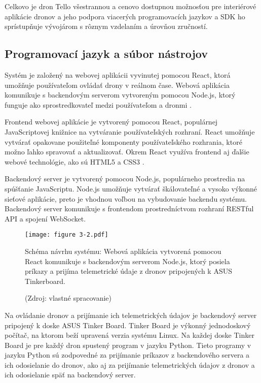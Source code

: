 Celkovo je dron Tello všestrannou a cenovo dostupnou možnosťou pre interiérové aplikácie dronov a jeho podpora viacerých programovacích jazykov a SDK ho sprístupňuje vývojárom s rôznym vzdelaním a úrovňou zručností. 

\subsection{Programovací jazyk a súbor nástrojov}
Systém je založený na webovej aplikácii vyvinutej pomocou React, ktorá umožňuje používateľom ovládať drony v reálnom čase. Webová aplikácia komunikuje s backendovým serverom vytvoreným pomocou Node.js, ktorý funguje ako sprostredkovateľ medzi používateľom a dronmi \citep{TelloSDK}.

Frontend webovej aplikácie je vytvorený pomocou React, populárnej JavaScriptovej knižnice na vytváranie používateľských rozhraní. React umožňuje vytvárať opakovane použiteľné komponenty používateľského rozhrania, ktoré možno ľahko spravovať a aktualizovať. Okrem React využíva frontend aj ďalšie webové technológie, ako sú HTML5 a CSS3 \citep{TelloSDK}.

Backendový server je vytvorený pomocou Node.js, populárneho prostredia na spúšťanie JavaScriptu. Node.js umožňuje vytvárať škálovateľné a vysoko výkonné sieťové aplikácie, preto je vhodnou voľbou na vybudovanie backendu systému. Backendový server komunikuje s frontendom prostredníctvom rozhraní RESTful API a spojení WebSocket.

\begin{figure}[ht!]
    \centering
    \texttt{[image: figure 3-2.pdf]}
    \caption{Schéma návrhu systému: Webová aplikácia vytvorená pomocou React komunikuje s backendovým serverom Node.js, ktorý posiela príkazy a prijíma telemetrické údaje z dronov pripojených k ASUS Tinkerboard.}
    \captionsetup{font=footnotesize, justification=centering, skip=5pt}
    \caption*{(Zdroj: vlastné spracovanie)}
    \label{o:3-2}
\end{figure}  

Na ovládanie dronov a prijímanie ich telemetrických údajov je backendový server pripojený k doske ASUS Tinker Board. Tinker Board je výkonný jednodoskový počítač, na ktorom beží upravená verzia systému Linux. Na každej doske Tinker Board je pre každý dron spustený program v jazyku Python. Tieto programy v jazyku Python sú zodpovedné za prijímanie príkazov z backendového servera a ich odosielanie do dronov, ako aj za prijímanie telemetrických údajov z dronov a ich odosielanie späť na backendový server.

